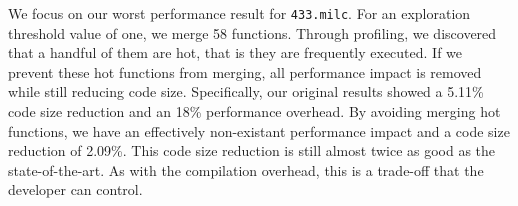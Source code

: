We focus on our worst performance result for \texttt{433.milc}. For an
exploration threshold value of one, we merge 58 functions. Through profiling, we discovered that a
handful of them are hot, that is they are frequently executed. If we prevent
these hot functions from merging, all performance impact is removed while still
reducing code size. Specifically, our original results showed a 5.11\% code size
reduction and an 18\% performance overhead. By avoiding merging hot functions,
we have an effectively non-existant performance impact and a code size reduction
of 2.09\%. This code size reduction is still almost twice as good as
the state-of-the-art. As with the compilation overhead, this is a trade-off that
the developer can control.






